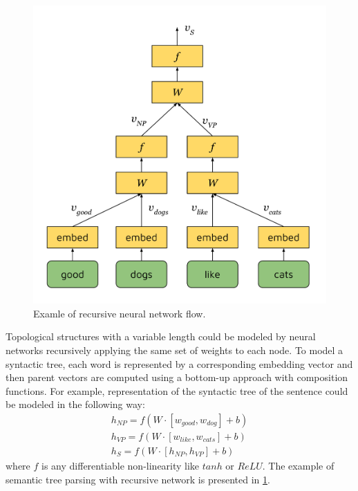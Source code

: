 \begin{figure}[h]
\centering
\includegraphics[width=5in]{Figures/rvnn.pdf}
\decoRule
\caption[RvNN flow]{Examle of recursive neural network flow.}
\label{fig:rvnn}
\end{figure}

Topological structures with a variable length could be modeled by neural networks recursively applying the same set of weights to each node. To model a syntactic tree, each word is represented by a corresponding embedding vector and then parent vectors are computed using a bottom-up approach with composition functions. For example, representation of the syntactic tree of the sentence  could be modeled in the following way:
\begin{equation}
\begin{split}
h_{NP} = f(W\cdot[w_{good}, w_{dog}] + b)\\
h_{VP} = f(W\cdot[w_{like}, w_{cats}] + b)\\
h_S = f(W\cdot[h_{NP}, h_{VP}] + b)
\label{rvnn:example}
\end{split}
\end{equation}
where $f$ is any differentiable non-linearity like $tanh$ or $ReLU$. The example of semantic tree parsing with recursive network is presented in \cref{fig:rvnn}.

